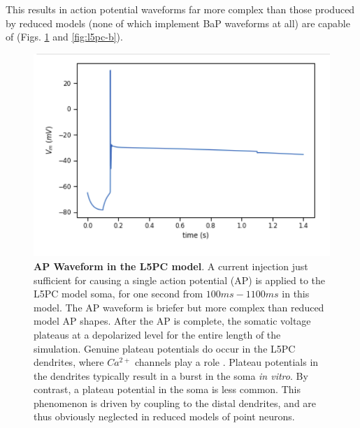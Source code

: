 
This results in action potential waveforms far more complex than those produced by reduced models (none of which implement BaP waveforms at all) are capable of (Figs. \ref{fig:l5pc-a} and \ref{fig:l5pc-b}).

\begin{figure}
\centering
\includegraphics[scale=0.8]{figures/correct_active_l5pc.png}
\caption[AP Waveform in the L5PC model (A)]{\textbf{AP Waveform in the L5PC model}.
A current injection just sufficient for causing a single action potential (AP) is applied to the L5PC model soma, for one second from $100ms-1100ms$ in this model.
The AP waveform is briefer but more complex than reduced model AP shapes.
After the AP is complete, the somatic voltage plateaus at a depolarized level for the entire length of the simulation.
Genuine plateau potentials do occur in the L5PC dendrites, where $Ca^{2+}$ channels play a role \citep{zhu2000maturation}.
Plateau potentials in the dendrites typically result in a burst in the soma \emph{in vitro}. 
By contrast, a plateau potential in the soma is less common.
This phenomenon is driven by coupling to the distal dendrites, and are thus obviously neglected in reduced models of point neurons.}
\label{fig:l5pc-a}
\end{figure}

